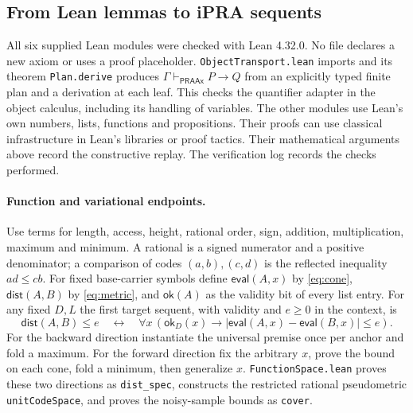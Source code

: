 \subsection{From Lean lemmas to iPRA sequents}

All six supplied Lean modules were checked with Lean 4.32.0. No file declares a new axiom or uses a proof placeholder. \texttt{ObjectTransport.lean} imports  and its theorem \texttt{Plan.derive} produces $\Gamma\vdash_{\mathsf{PRAAx}}P\to Q$ from an explicitly typed finite plan and a derivation at each leaf. This checks the quantifier adapter in the object calculus, including its handling of variables. The other modules use Lean's own numbers, lists, functions and propositions. Their proofs can use classical infrastructure in Lean's libraries or proof tactics. Their mathematical arguments above record the constructive replay. The verification log records the checks performed.

\paragraph{Function and variational endpoints.}
Use terms for length, access, height, rational order, sign, addition, multiplication, maximum and minimum. A rational is a signed numerator and a positive denominator; a comparison of codes $(a,b),(c,d)$ is the reflected inequality $ad\le cb$. For fixed base-carrier symbols define $\mathsf{eval}(A,x)$ by \eqref{eq:cone}, $\mathsf{dist}(A,B)$ by \eqref{eq:metric}, and $\mathsf{ok}(A)$ as the validity bit of every list entry. For any fixed $D,L$ the first target sequent, with validity and $e\ge0$ in the context, is
\[
 \mathsf{dist}(A,B)\le e\quad\longleftrightarrow\quad
 \forall x\,(\mathsf{ok}_D(x)\to
     |\mathsf{eval}(A,x)-\mathsf{eval}(B,x)|\le e).
\]
For the backward direction instantiate the universal premise once per anchor and fold a maximum. For the forward direction fix the arbitrary $x$, prove the bound on each cone, fold a minimum, then generalize $x$. \texttt{FunctionSpace.lean} proves these two directions as \texttt{dist\_spec}, constructs the restricted rational pseudometric \texttt{unitCodeSpace}, and proves the noisy-sample bounds as \texttt{cover}.

